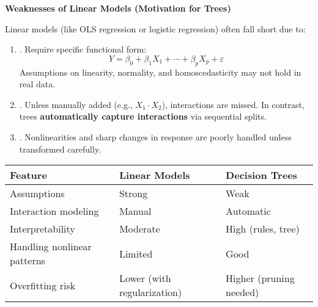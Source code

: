 \begin{flushleft}
    \textcolor{Red2}{ \textbf{Weaknesses of Linear Models (Motivation for Trees)}}
\end{flushleft}
Linear models (like OLS regression or logistic regression) often fall short due to:
\begin{enumerate}
    \item {}. Require specific functional form:
    \begin{equation*}
        Y = \beta_0 + \beta_1 X_1 + \cdots + \beta_p X_p + \varepsilon
    \end{equation*}
    Assumptions on linearity, normality, and homoscedasticity may not hold in real data.
    \item {}. Unless manually added (e.g., $X_1 \cdot X_2$), interactions are missed. In contrast, trees \textbf{automatically capture interactions} via sequential splits.
    \item {}. Nonlinearities and sharp changes in response are poorly handled unless transformed carefully.
\end{enumerate}


\begin{table}[!htp]
    \centering
    \begin{adjustbox}{width={\textwidth},totalheight={\textheight},keepaspectratio}
        \begin{tabular}{@{} l l l @{}}
            \toprule
            \textbf{Feature} & \textbf{Linear Models} & \textbf{Decision Trees} \\
            \midrule
            Assumptions                 & Strong                      & Weak                    \\ [.5em]
            Interaction modeling        & Manual                      & Automatic               \\ [.5em]
            Interpretability            & Moderate                    & High (rules, tree)      \\ [.5em]
            Handling nonlinear patterns & Limited                     & Good                    \\ [.5em]
            Overfitting risk            & Lower (with regularization) & Higher (pruning needed) \\
            \bottomrule
        \end{tabular}
    \end{adjustbox}
\end{table}

